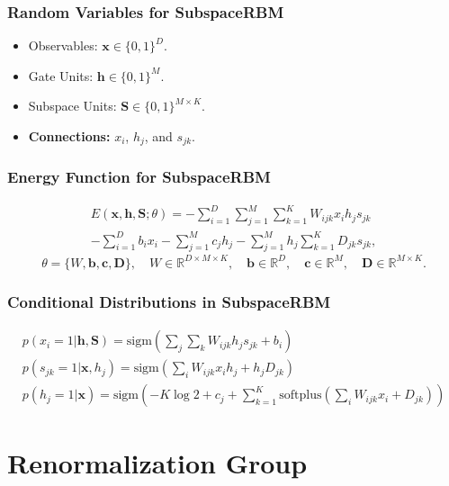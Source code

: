 \documentclass{antclass}
\begin{document}
\pagebreak
\subsection{Random Variables for SubspaceRBM}
\begin{itemize}
	\item Observables: \( \mathbf{x} \in \{0, 1\}^D \).
	\item Gate Units: \( \mathbf{h} \in \{0, 1\}^M \).
	\item Subspace Units: \( \mathbf{S} \in \{0, 1\}^{M \times K} \).
	\item \textbf{Connections:} \( x_i \), \( h_j \), and \( s_{jk} \).
\end{itemize}

\pagebreak

\subsection{Energy Function for SubspaceRBM}
	\begin{align}
	E(\mathbf{x}, \mathbf{h}, \mathbf{S}; \theta) =
	-\sum_{i=1}^D \sum_{j=1}^M \sum_{k=1}^K W_{ijk} x_i h_j s_{jk} \nonumber \\
	-\sum_{i=1}^D b_i x_i 
	-\sum_{j=1}^M c_j h_j 
	-\sum_{j=1}^M h_j \sum_{k=1}^K D_{jk} s_{jk},
	\end{align}
	\[
	\theta = \{W, \mathbf{b}, \mathbf{c}, \mathbf{D}\}, \quad 
	W \in \mathbb{R}^{D \times M \times K}, \quad \mathbf{b} \in \mathbb{R}^D, \quad \mathbf{c} \in \mathbb{R}^M, \quad \mathbf{D} \in \mathbb{R}^{M \times K}.
	\]
	
	
\pagebreak
\subsection{Conditional Distributions in SubspaceRBM}
\begin{gather}	
	p(x_i = 1 | \mathbf{h}, \mathbf{S}) = \mathrm{sigm}\left(\sum_j \sum_k W_{ijk} h_j s_{jk} + b_i\right) \\
	p(s_{jk} = 1 | \mathbf{x}, h_j) = \mathrm{sigm}\left(\sum_i W_{ijk} x_i h_j + h_j D_{jk}\right) \\
	p(h_j = 1 | \mathbf{x}) = \mathrm{sigm}\left(-K \log 2 + c_j + \sum_{k=1}^K \mathrm{softplus}\left(\sum_i W_{ijk} x_i + D_{jk}\right)\right)
\end{gather}

\chapter{Renormalization Group}
\end{document}
